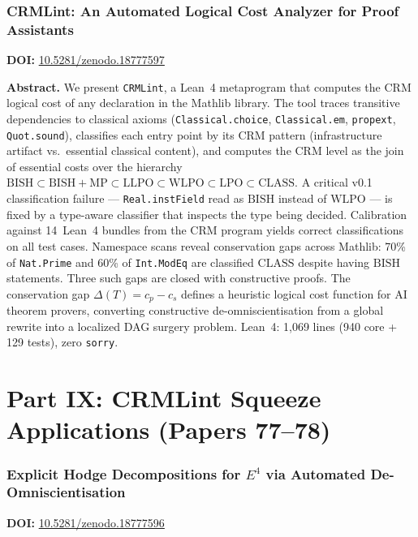 \documentclass[11pt,a4paper]{article}
\begin{document}
\section{CRMLint: An Automated Logical Cost Analyzer for Proof Assistants}
\label{sec:p76}
\textbf{DOI:} \href{https://doi.org/10.5281/zenodo.18777597}{10.5281/zenodo.18777597}

\bigskip
\noindent\textbf{Abstract.}
We present \texttt{CRMLint}, a Lean~4 metaprogram that computes the CRM logical cost of any declaration in the Mathlib library. The tool traces transitive dependencies to classical axioms (\texttt{Classical.choice}, \texttt{Classical.em}, \texttt{propext}, \texttt{Quot.sound}), classifies each entry point by its CRM pattern (infrastructure artifact vs.\ essential classical content), and computes the CRM level as the join of essential costs over the hierarchy $\mathrm{BISH} \subset \mathrm{BISH{+}MP} \subset \mathrm{LLPO} \subset \mathrm{WLPO} \subset \mathrm{LPO} \subset \mathrm{CLASS}$. A critical v0.1 classification failure --- \texttt{Real.instField} read as $\mathrm{BISH}$ instead of $\mathrm{WLPO}$ --- is fixed by a type-aware classifier that inspects the type being decided. Calibration against 14~Lean~4 bundles from the CRM program yields correct classifications on all test cases. Namespace scans reveal conservation gaps across Mathlib: 70\% of \texttt{Nat.Prime} and 60\% of \texttt{Int.ModEq} are classified $\mathrm{CLASS}$ despite having $\mathrm{BISH}$ statements. Three such gaps are closed with constructive proofs. The conservation gap $\Delta(T) = c_p - c_s$ defines a heuristic logical cost function for AI theorem provers, converting constructive de-omniscientisation from a global rewrite into a localized DAG surgery problem. Lean~4: 1,069 lines (940 core + 129 tests), zero \texttt{sorry}.

\newpage
\part*{Part IX: CRMLint Squeeze Applications (Papers 77--78)}

\section{Explicit Hodge Decompositions for $E^4$ via Automated De-Omniscientisation}
\label{sec:p77}
\textbf{DOI:} \href{https://doi.org/10.5281/zenodo.18777596}{10.5281/zenodo.18777596}
\end{document}
